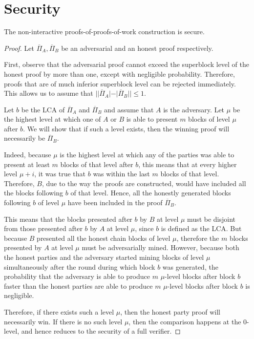 \section{Security}

\begin{theorem}
    The non-interactive proofs-of-proofs-of-work construction is secure.
\end{theorem}

\begin{proof}
    Let $\overline{\Pi}_A, \overline{\Pi}_B$ be an adversarial and an honest
    proof respectively.

    First, observe that the adversarial proof cannot exceed the superblock
    level of the honest proof by more than one, except with negligible
    probability. Therefore, proofs that are of much inferior superblock level
    can be rejected immediately. This allows us to assume that
    $||\overline{\Pi}_A| - |\overline{\Pi}_B|| \leq 1$.

    Let $b$ be the LCA of $\overline{\Pi}_A$ and $\overline{\Pi}_B$ and assume
    that $A$ is the adversary. Let $\mu$ be the highest level at which one of $A$
    or $B$ is able to present $m$ blocks of level $\mu$ after $b$. We will show
    that if such a level exists, then the winning proof will necessarily be
    $\overline{\Pi}_B$.

    Indeed, because $\mu$ is the highest level at which any of the parties was
    able to present at least $m$ blocks of that level after $b$, this means
    that at every higher level $\mu + i$, it was true that $b$ was within the
    last $m$ blocks of that level. Therefore, $B$, due to the way the proofs
    are constructed, would have included all the blocks following $b$ of that
    level. Hence, all the honestly generated blocks following $b$ of level
    $\mu$ have been included in the proof $\overline{\Pi}_B$.

    This means that the blocks presented after $b$ by $B$ at level $\mu$ must
    be disjoint from those presented after $b$ by $A$ at level $\mu$, since $b$
    is defined as the LCA. But because $B$ presented all the honest chain
    blocks of level $\mu$, therefore the $m$ blocks presented by $A$ at level
    $\mu$ must be adversarially mined.  However, because both the honest
    parties and the adversary started mining blocks of level $\mu$
    simultaneously after the round during which block $b$ was generated, the
    probability that the adversary is able to produce $m$ $\mu$-level blocks
    after block $b$ faster than the honest parties are able to produce $m$
    $\mu$-level blocks after block $b$ is negligible.

    Therefore, if there exists such a level $\mu$, then the honest party proof
    will necessarily win. If there is no such level $\mu$, then the comparison
    happens at the 0-level, and hence reduces to the security of a full
    verifier.
\end{proof}


